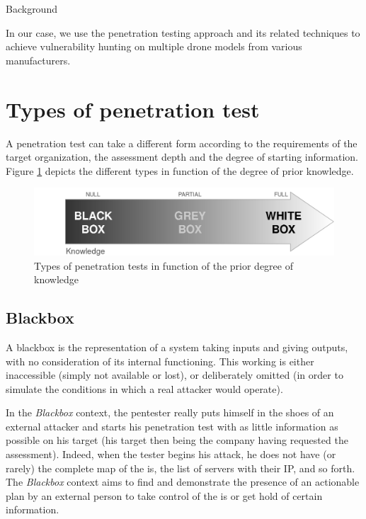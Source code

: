 \begin{chaptercover}{Background}
\begin{tip} 
In our case, we use the penetration testing approach and its related techniques to achieve vulnerability hunting on multiple drone models from various manufacturers.
\end{tip}

\section{Types of penetration test}

A penetration test can take a different form according to the requirements of the target organization, the assessment depth and the degree of starting information. Figure \ref{fig:pentest-types} depicts the different types in function of the degree of prior knowledge.

\begin{figure}[H]
  \centering
  \includegraphics[width=.7\linewidth]{figures/pentest-types}
  \caption{Types of penetration tests in function of the prior degree of knowledge}
  \label{fig:pentest-types}
\end{figure}

\subsection{Blackbox}

A blackbox is the representation of a system taking inputs and giving outputs, with no consideration of its internal functioning. This working is either inaccessible (simply not available or lost), or deliberately omitted (in order to simulate the conditions in which a real attacker would operate).

In the \textit{Blackbox} context, the pentester really puts himself in the shoes of an external attacker and starts his penetration test with as little information as possible on his target (his target then being the company having requested the assessment). Indeed, when the tester begins his attack, he does not have (or rarely) the complete map of the \acrshort{is}, the list of servers with their IP, and so forth. The \textit{Blackbox} context aims to find and demonstrate the presence of an actionable plan by an external person to take control of the \acrshort{is} or get hold of certain information.


\end{chaptercover}

